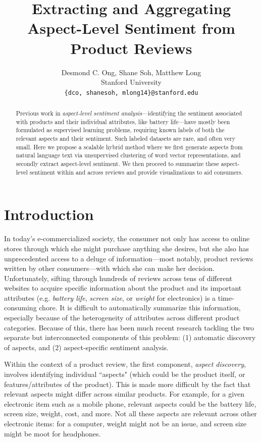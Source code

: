 \documentclass{article} %
\title{  Extracting and Aggregating Aspect-Level Sentiment from Product Reviews  }
\author{
Desmond C. Ong, Shane Soh, Matthew Long \\
Stanford University \\
\texttt{\{dco, shanesoh, mlong14\}@stanford.edu}
}
\begin{document}
\maketitle

\begin{abstract}
Previous work in \textit{aspect-level sentiment analysis}---identifying the sentiment associated with products and their individual attributes, like battery life---have mostly been formulated as supervised learning problems, requiring known labels of both the relevant aspects and their sentiment. Such labeled datasets are rare, and often very small. Here we propose a scalable hybrid method where we first generate aspects from natural language text via unsupervised clustering of word vector representations, and secondly extract aspect-level sentiment. We then proceed to summarize these aspect-level sentiment within and across reviews and provide visualizations to aid consumers.
\end{abstract}

\section{Introduction}

In today's e-commercialized society, the consumer not only has access to online stores through which she might purchase anything she desires, but she also has unprecedented access to a deluge of information---most notably, product reviews written by other consumers---with which she can make her decision. Unfortunately, sifting through hundreds of reviews across tens of different websites to acquire specific information about the product and its important attributes (e.g. \textit{battery life}, \textit{screen size}, or \textit{weight} for electronics) is a time-consuming chore. It is difficult to automatically summarize this information, especially because of the heterogeneity of attributes across different product categories. Because of this, there has been much recent research tackling the two separate but interconnected components of this problem: (1) automatic discovery of aspects, and (2) aspect-specific sentiment analysis.

Within the context of a product review, the first component, \textit{aspect discovery}, involves identifying individual ``aspects" (which could be the product itself, or features/attributes of the product). This is made more difficult by the fact that relevant aspects might differ across similar products. For example, for a given electronic item such as a mobile phone, relevant aspects could be the battery life, screen size, weight, cost, and more. Not all these aspects are relevant across other electronic items: for a computer, weight might not be an issue, and screen size might be moot for headphones. 
\end{document}
